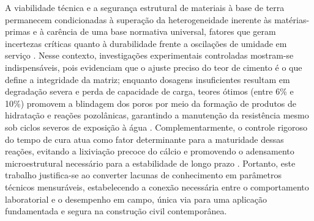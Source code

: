 
A viabilidade técnica e a segurança estrutural de materiais à base de terra permanecem condicionadas à superação da heterogeneidade inerente às matérias-primas e à carência de uma base normativa universal, fatores que geram incertezas críticas quanto à durabilidade frente a oscilações de umidade em serviço \cite{Giada2019, Pham2022, Santana2021, Martins2018, Bogas2019, VanDerLinden2019}. Nesse contexto, investigações experimentais controladas mostram-se indispensáveis, pois evidenciam que o ajuste preciso do teor de cimento é o que define a integridade da matriz; enquanto dosagens insuficientes resultam em degradação severa e perda de capacidade de carga, teores ótimos (entre 6\% e 10\%) promovem a blindagem dos poros por meio da formação de produtos de hidratação e reações pozolânicas, garantindo a manutenção da resistência mesmo sob ciclos severos de exposição à água \cite{Morel2021, Martins2018, Roshan2022, Ralf2025, Wahabi2021}. Complementarmente, o controle rigoroso do tempo de cura atua como fator determinante para a maturidade dessas reações, evitando a lixiviação precoce do cálcio e promovendo o adensamento microestrutural necessário para a estabilidade de longo prazo \cite{Ezreig2022,Morel2021}. Portanto, este trabalho justifica-se ao converter lacunas de conhecimento em parâmetros técnicos mensuráveis, estabelecendo a conexão necessária entre o comportamento laboratorial e o desempenho em campo, única via para uma aplicação fundamentada e segura na construção civil contemporânea.






